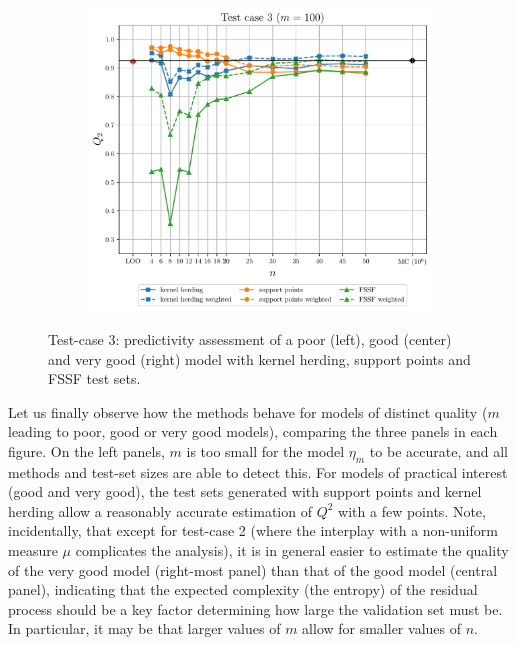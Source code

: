 \begin{landscape}
\begin{figure}
\begin{subfigure}[b]{0.32\linewidth}
    \end{subfigure}
    \centering
    \begin{subfigure}[b]{0.32\linewidth}
      \centering
      \includegraphics[width=\linewidth]{./part2/figures/SIS/gsobol_learnsize_100.pdf}
    \end{subfigure}
    \caption{Test-case 3: predictivity assessment of a poor (left), good (center) and very good (right) model with kernel herding, support points and FSSF test sets.}
    \label{fig:gsobol_benchmark}
  \end{figure}
\end{landscape}

Let us finally observe how the methods behave for models of distinct quality ($m$ leading to poor, good or very good models), comparing the three panels in each figure. 
On the left panels, $m$ is too small for the model $\eta_m$ to be accurate, and all methods and test-set sizes are able to detect this. 
For models of practical interest (good and very good), the test sets generated with support points and kernel herding allow a reasonably accurate estimation of $Q^2$ with a few points. 
Note, incidentally, that except for test-case 2 (where the interplay with a non-uniform measure $\mu$ complicates the analysis), it is in general easier to estimate the quality of the very good model (right-most panel) than that of the good model (central panel), indicating that the expected complexity (the entropy) of the residual process should be a key factor determining how large the validation set must be. 
In particular, it may be that larger values of $m$ allow for smaller values of $n$.





